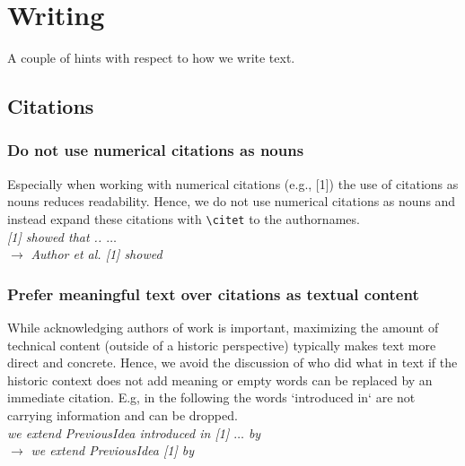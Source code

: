 \documentclass[sigplan]{acmart}
\newenvironment{draftonly}{}{}
\begin{document}
\begin{draftonly}
\section{Writing}

A couple of hints with respect to how we write text.

\subsection{Citations}
\label{appendix:citations}

\subsubsection{Do not use numerical citations as nouns}
Especially when working with numerical citations (e.g., [1]) the use of
citations as nouns reduces readability. Hence, we do not use numerical citations
as nouns and instead expand these citations with \texttt{\textbackslash{}citet} to the
authornames.
\\
{\color{pairedTwoDarkBlue}
\textit{[1] showed that .. $\dots$}}\\
$\to$ {\color{pairedFourDarkGreen}\textit{Author et al. [1] showed}}

\subsubsection{Prefer meaningful text over citations as textual content}
While acknowledging authors of work is important, maximizing the amount of technical
content (outside of a historic perspective) typically makes text more direct and
concrete. Hence, we avoid the discussion of who did what in text if the
historic context does not add meaning or empty words can be replaced by an immediate
citation. E.g, in the following the words `introduced in` are not carrying
information and can be dropped.\\
{\color{pairedTwoDarkBlue}
\textit{we extend PreviousIdea introduced in [1] $\dots$ by}}\\
$\to$ {\color{pairedFourDarkGreen}\textit{we extend PreviousIdea [1] by}}


\end{draftonly}
\end{document}
